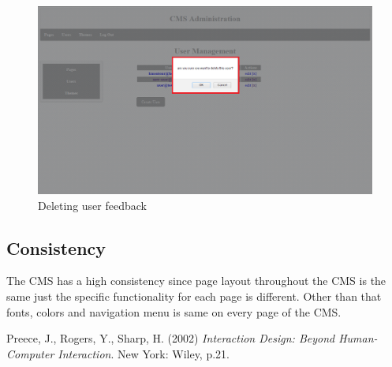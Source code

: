 \documentclass[12pt]{article}
\begin{document}
\begin{figure}[H]
 \centering
    \includegraphics[width=\textwidth,height=\textheight,keepaspectratio]{pics/deleteUser_3.png}
    \caption{Deleting user feedback}
\end{figure}


\subsection{Consistency}
The CMS has a high consistency since page layout throughout the CMS is the same just the specific functionality for each page is different. Other than that fonts, colors and navigation menu is same on every page of the CMS.


\pagebreak


\begin{thebibliography}{9}
 Preece, J., Rogers, Y., Sharp, H. (2002)
\textit{ Interaction Design: Beyond Human-Computer Interaction}.
New York: Wiley, p.21.
\end{thebibliography}
\end{document}
